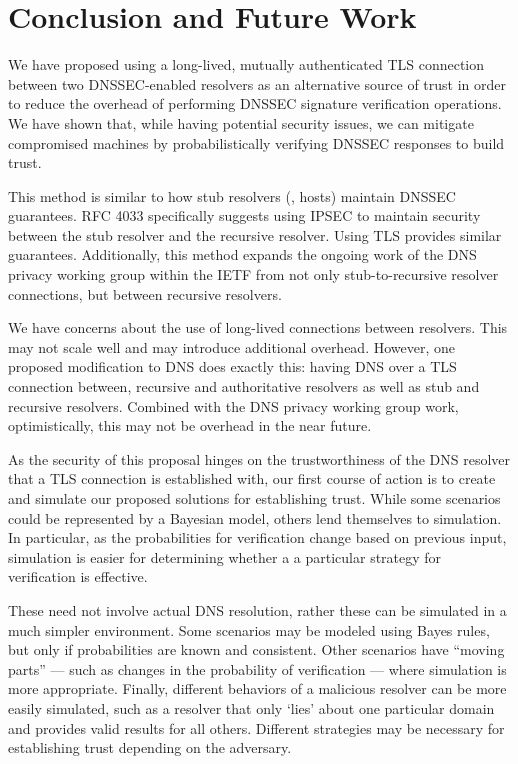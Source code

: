 \section{Conclusion and Future Work}\label{sec:conclusion}

We have proposed using a long-lived, mutually authenticated TLS connection
between two DNSSEC-enabled resolvers as an alternative source of trust in order
to reduce the overhead of performing DNSSEC signature  verification operations.
We have shown that, while having potential security issues, we can mitigate 
compromised machines by probabilistically verifying DNSSEC responses to build 
trust.

This method is similar to how stub resolvers (\ie, hosts) maintain DNSSEC 
guarantees. RFC 4033 specifically suggests using IPSEC to maintain security
between the stub resolver and the recursive resolver.\cite{rfc4033} Using TLS
provides similar guarantees. Additionally, this method expands the ongoing work
of the DNS privacy working group within the IETF from not only stub-to-recursive
resolver connections, but between recursive resolvers.\cite{dnsprive2015}

We have concerns about the use of long-lived connections between resolvers. This
may not scale well and may introduce additional overhead. However, one proposed 
modification to DNS does exactly this: having DNS over a TLS connection between,
recursive and authoritative resolvers as well as stub and recursive 
resolvers.\cite{zhu2015connection} Combined with the DNS privacy working group
work, optimistically, this may not be overhead in the near future.

As the security of this proposal hinges on the trustworthiness of the DNS 
resolver that a TLS connection is established with, our first course of action 
is to create and simulate our proposed solutions for establishing trust. 
While some scenarios could be represented by a Bayesian model, others lend 
themselves to simulation. In particular, as the probabilities for verification 
change based on previous input, simulation is easier for determining whether a
a particular strategy for verification is effective.


These 
need not involve actual DNS resolution, rather these can be simulated in a much
simpler environment. Some scenarios may be modeled using Bayes rules, but only
if probabilities are known and consistent. Other scenarios have ``moving 
parts'' --- such as changes in the probability of verification --- where 
simulation is more appropriate. Finally, different behaviors of a malicious 
resolver can be more easily simulated, such as a resolver that only `lies' about
one particular domain and provides valid results for all others. Different 
strategies may be necessary for establishing trust depending on the adversary.

